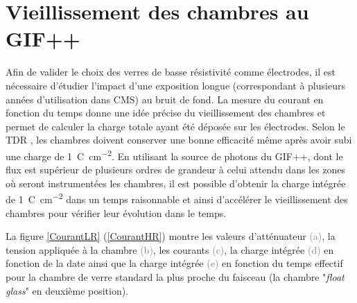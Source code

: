\section{Vieillissement des chambres au GIF++}
\label{VIEE}
\vspace*{-0.4cm}
Afin de valider le choix des verres de basse résistivité comme électrodes, il est nécessaire d'étudier l'impact d'une exposition longue (correspondant à plusieurs années d'utilisation dans CMS) au bruit de fond. La mesure du courant en fonction du temps donne une idée précise du vieillissement des chambres et permet de calculer la charge totale ayant été déposée sur les électrodes. Selon le TDR \cite{Lourenco:2283189}, les chambres doivent conserver une bonne efficacité même après avoir subi une charge de \SI{1}{\coulomb\per\square\centi\meter}. En utilisant la source de photons du GIF++, dont le flux est supérieur de plusieurs ordres de grandeur à celui attendu dans les zones où seront instrumentées les chambres, il est possible d'obtenir la charge intégrée de \SI{1}{\coulomb\per\square\centi\meter} dans un temps raisonnable et ainsi d'accélérer le vieillissement des chambres pour vérifier leur évolution dans le temps.

La figure \ref{CourantLR} (\ref{CourantHR}) montre les valeurs d'atténuateur \textcolor{gray}{(a)}, la tension appliquée à la chambre \textcolor{gray}{(b)}, les courants \textcolor{gray}{(c)}, la charge intégrée \textcolor{gray}{(d)} en fonction de la date ainsi que la charge intégrée \textcolor{gray}{(e)} en fonction du temps effectif pour la chambre de verre standard la plus proche du faisceau (la chambre "\textit{float glass}" en deuxième position). 

